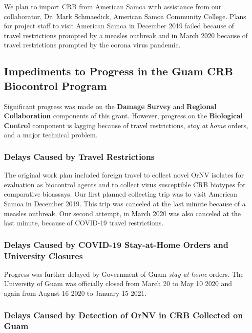 \documentclass[12pt,letterpaper,english,bibliography=totocnumbered,abstract=on]{scrartcl}
\begin{document}
We plan to import CRB from American Samoa with assistance from our collaborator, Dr. Mark Schmaedick, American Samoa Community College. Plans for project staff to visit American Samoa in December 2019 failed because of travel restrictions prompted by a measles outbreak and in March 2020 because of travel restrictions prompted by the corona virus pandemic. 

\newpage
\subsection{Impediments to Progress in the Guam CRB Biocontrol Program}

Significant progress was made on the \textbf{Damage Survey} and \textbf{Regional Collaboration} components of this grant. However, progress on the \textbf{Biological Control} component is lagging because of travel restrictions, \textit{stay at home} orders, and a major technical problem. 

\subsubsection{Delays Caused by Travel Restrictions}

The original work plan included foreign travel to collect novel OrNV isolates for evaluation as biocontrol agents and to collect virus susceptible CRB biotypes for comparative bioassays. Our first planned collecting trip was to visit American Samoa in December 2019. This trip was canceled at the last minute because of a measles outbreak. Our second attempt, in March 2020 was also canceled at the last minute, because of COVID-19 travel restrictions. 

\subsubsection{Delays Caused by COVID-19 Stay-at-Home Orders and University Closures}

Progress was further delayed by Government of Guam \textit{stay at home} orders. The University of Guam was officially closed from March 20 to May 10 2020 and again from August 16 2020 to January 15 2021.

\subsubsection{Delays Caused by Detection of OrNV in CRB Collected on Guam}

\end{document}
